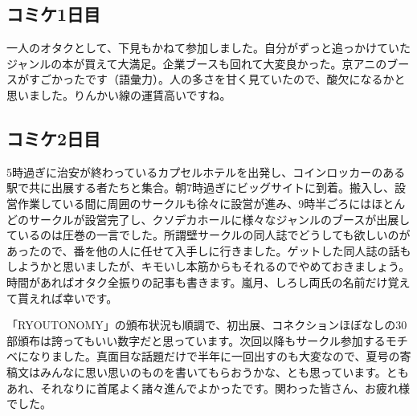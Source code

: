 \subsection{コミケ1日目}
  一人のオタクとして、下見もかねて参加しました。自分がずっと追っかけていたジャンルの本が買えて大満足。企業ブースも回れて大変良かった。京アニのブースがすごかったです（語彙力）。人の多さを甘く見ていたので、酸欠になるかと思いました。りんかい線の運賃高いですね。

\subsection{コミケ2日目}
  5時過ぎに治安が終わっているカプセルホテルを出発し、コインロッカーのある駅で共に出展する者たちと集合。朝7時過ぎにビッグサイトに到着。搬入し、設営作業している間に周囲のサークルも徐々に設営が進み、9時半ごろにはほとんどのサークルが設営完了し、クソデカホールに様々なジャンルのブースが出展しているのは圧巻の一言でした。所謂壁サークルの同人誌でどうしても欲しいのがあったので、番を他の人に任せて入手しに行きました。ゲットした同人誌の話もしようかと思いましたが、キモいし本筋からもそれるのでやめておきましょう。時間があればオタク全振りの記事も書きます。嵐月、しろし両氏の名前だけ覚えて貰えれば幸いです。
  
  「RYOUTONOMY」の頒布状況も順調で、初出展、コネクションほぼなしの30部頒布は誇ってもいい数字だと思っています。次回以降もサークル参加するモチベになりました。真面目な話題だけで半年に一回出すのも大変なので、夏号の寄稿文はみんなに思い思いのものを書いてもらおうかな、とも思っています。ともあれ、それなりに首尾よく諸々進んでよかったです。関わった皆さん、お疲れ様でした。


